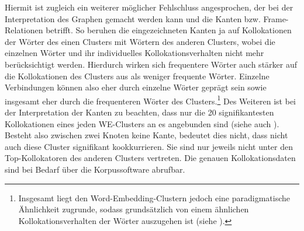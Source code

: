 Hiermit ist zugleich ein weiterer möglicher Fehlschluss angesprochen, der bei der Interpretation des Graphen gemacht werden kann und die Kanten bzw. Frame-Relationen betrifft. So beruhen die eingezeichneten Kanten ja auf Kollokationen der Wörter des einen Clusters mit Wörtern des anderen Clusters, wobei die einzelnen Wörter und ihr individuelles Kollokationsverhalten nicht mehr berücksichtigt werden. Hierdurch wirken sich frequentere Wörter auch stärker auf die Kollokationen des Clusters aus als weniger frequente Wörter. Einzelne Verbindungen können also eher durch einzelne Wörter geprägt sein sowie insgesamt eher durch die frequenteren Wörter des Clusters.\footnote{Insgesamt liegt den Word-Embedding-Clustern jedoch eine paradigmatische Ähnlichkeit zugrunde, sodass grundsätzlich von einem ähnlichen Kollokationsverhalten der Wörter auszugehen ist (siehe ).} Des Weiteren ist bei der Interpretation der Kanten zu beachten, dass nur die 20 signifikantesten Kollokationen eines jeden WE-Clusters an es angebunden sind (siehe auch ). Besteht also zwischen zwei Knoten keine Kante, bedeutet dies nicht, dass nicht auch diese Cluster signifikant kookkurrieren. Sie sind nur jeweils nicht unter den Top-Kollokatoren des anderen Clusters vertreten. Die genauen Kollokationsdaten sind bei Bedarf über die Korpussoftware abrufbar.

